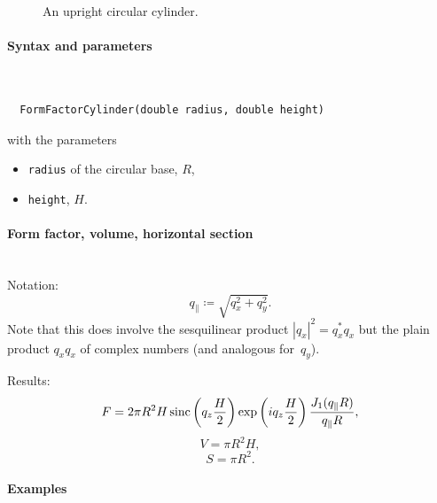 \begin{figure}[H]
\hfill
{}
\hfill
{}
\hfill
{}
\hfill
\caption{An upright circular cylinder.}
\end{figure}

\paragraph{Syntax and parameters}\strut\\[-2ex plus .2ex minus .2ex]
\begin{lstlisting}
  FormFactorCylinder(double radius, double height)
\end{lstlisting}
with the parameters
\begin{itemize}
\item \texttt{radius} of the circular base, $R$,
\item \texttt{height}, $H$.
\end{itemize}

\paragraph{Form factor, volume, horizontal section}\strut\\
Notation:
\begin{equation*}
  q_{\parallel} \coloneqq \sqrt{q_x^2+q_y^2}.
\end{equation*}
Note that this does  involve the sesquilinear product
$|q_x|^2=q_x^* q_x$ but the plain product $q_xq_x$ of complex numbers
(and analogous for~$q_y$).

Results:
\begin{equation*}
  F=  2\pi R^2 H  \operatorname{sinc}\left(q_ z \frac{H}{2}\right) \exp\left(i q_ z \frac{H}{2}\right)
    \frac{J_1(q_{\parallel} R )}{q_{\parallel} R },
\end{equation*}
\begin{equation*}
  V = \pi R^2 H,
\end{equation*}
\begin{equation*}
  S=\pi R^2.
\end{equation*}

\paragraph{Examples}\strut

